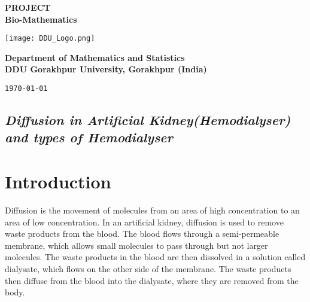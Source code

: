 \documentclass[12pt, a4paper]{article} %
\begin{document}
\begin{titlepage}
    \begin{center}
        \vspace*{1cm}

        \Large{\bf PROJECT}\\ 
        \Large{\textbf{Bio-Mathematics}}
        

        \vspace*{1cm}

        \texttt{[image: DDU\_Logo.png]}
        \vspace*{1cm}

        \begin{center}
            {\bf Department of Mathematics and Statistics\\
        DDU Gorakhpur University, Gorakhpur (India)}
        \end{center}
        
        \vfill %

        {\tt \today}\\
    \end{center}
\end{titlepage}

\BgThispage
\tableofcontents
\thispagestyle{empty}
\clearpage

\setcounter{page}{1}

\vspace*{0.2cm}

\BgThispage
\begin{center}
    \section*{\slshape Diffusion in Artificial Kidney(Hemodialyser)\\ and types of Hemodialyser}
\end{center}

\section{Introduction}
Diffusion is the movement of molecules from an area of high concentration to an area of low concentration. In an artificial kidney, diffusion is used to remove waste products from the blood. The blood flows through a semi-permeable membrane, which allows small molecules to pass through but not larger molecules. The waste products in the blood are then dissolved in a solution called dialysate, which flows on the other side of the membrane. The waste products then diffuse from the blood into the dialysate, where they are removed from the body.
\end{document}
